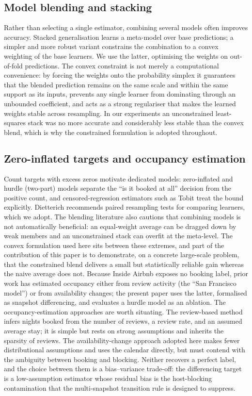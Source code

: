 \documentclass[review,12pt]{elsarticle}
\begin{document}
\subsection{Model blending and stacking}
Rather than selecting a single estimator, combining several models often improves
accuracy. Stacked generalisation \citep{wolpert1992stacked} learns a meta-model
over base predictions; a simpler and more robust variant constrains the
combination to a convex weighting of the base learners. We use the latter,
optimising the weights on out-of-fold predictions. The convex constraint is not
merely a computational convenience: by forcing the weights onto the probability
simplex it guarantees that the blended prediction remains on the same scale and
within the same support as its inputs, prevents any single learner from dominating
through an unbounded coefficient, and acts as a strong regulariser that makes the
learned weights stable across resampling. In our experiments an unconstrained
least-squares stack was no more accurate and considerably less stable than the
convex blend, which is why the constrained formulation is adopted throughout.

\subsection{Zero-inflated targets and occupancy estimation}
Count targets with excess zeros motivate dedicated models: zero-inflated and
hurdle (two-part) models separate the ``is it booked at all'' decision from the
positive count, and censored-regression estimators such as Tobit \citep{tobin1958}
treat the bound explicitly. Dietterich \citeyearpar{dietterich1998} recommends paired
resampling tests for comparing learners, which we adopt. The blending literature also cautions that combining models is not automatically
beneficial: an equal-weight average can be dragged down by weak members and an
unconstrained stack can overfit at the meta-level. The convex formulation used here
sits between these extremes, and part of the contribution of this paper is to
demonstrate, on a concrete large-scale problem, that the constrained blend delivers
a small but statistically reliable gain whereas the naive average does not.
Because Inside Airbnb
exposes no booking label, prior work has estimated occupancy either from
review activity (the ``San Francisco model'') or from availability changes; the
present paper uses the latter, formalised as snapshot differencing, and evaluates
a hurdle model as an ablation. The occupancy-estimation approaches are worth
situating. The review-based method infers nights booked from the number of reviews,
a review rate, and an assumed average stay; it is simple but rests on strong
assumptions and inherits the sparsity of reviews. The availability-change approach
adopted here makes fewer distributional assumptions and uses the calendar directly,
but must contend with the ambiguity between booking and blocking. Neither recovers a
perfect label, and the choice between them is a bias--variance trade-off: the
differencing target is a low-assumption estimator whose residual bias is the
host-blocking contamination that the multi-snapshot transition rule is designed to
suppress.
\end{document}

